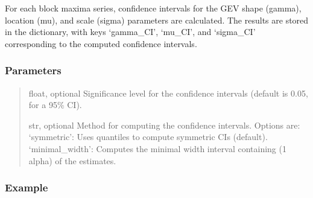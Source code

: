 \documentclass[a4paper,11pt,openany,english]{sphinxmanual}
\begin{document}
\begin{fulllineitems}
\begin{fulllineitems}
\begin{itemize}
\end{itemize}

\sphinxAtStartPar
For each block maxima series, confidence intervals for the GEV shape (gamma), location (mu), and scale (sigma) parameters are calculated. The results 
are stored in the  dictionary, with keys ‘gamma\_CI’, ‘mu\_CI’, and ‘sigma\_CI’ corresponding to the computed confidence intervals.


\subsubsection{Parameters}
\label{\detokenize{api_topt:id52}}\begin{quote}\begin{description}
\sphinxAtStartPar
float, optional
Significance level for the confidence intervals (default is 0.05, for a 95\% CI).

\sphinxAtStartPar
str, optional
Method for computing the confidence intervals. Options are:
\sphinxhyphen{} ‘symmetric’: Uses quantiles to compute symmetric CIs (default).
\sphinxhyphen{} ‘minimal\_width’: Computes the minimal width interval containing (1 \sphinxhyphen{} alpha) of the estimates.

\end{description}\end{quote}


\subsubsection{Example}
\label{\detokenize{api_topt:id53}}
\begin{sphinxVerbatim}[commandchars=\\\{\}]
  
 
\end{sphinxVerbatim}



\end{fulllineitems}
\end{fulllineitems}
\end{document}
